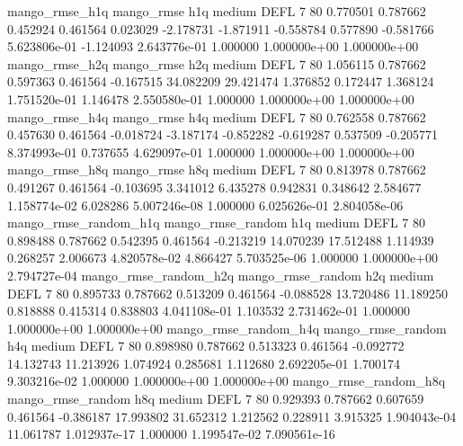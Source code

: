       mango_rmse_h1q        mango_rmse                  h1q     medium     DEFL                 7 80  0.770501       0.787662 0.452924       0.461564    0.023029     -2.178731     -1.871911    -0.558784       0.577890 -0.581766 5.623806e-01    -1.124093   2.643776e-01            1.000000    1.000000e+00        1.000000e+00
       mango_rmse_h2q        mango_rmse                  h2q     medium     DEFL                 7 80  1.056115       0.787662 0.597363       0.461564   -0.167515     34.082209     29.421474     1.376852       0.172447  1.368124 1.751520e-01     1.146478   2.550580e-01            1.000000    1.000000e+00        1.000000e+00
       mango_rmse_h4q        mango_rmse                  h4q     medium     DEFL                 7 80  0.762558       0.787662 0.457630       0.461564   -0.018724     -3.187174     -0.852282    -0.619287       0.537509 -0.205771 8.374993e-01     0.737655   4.629097e-01            1.000000    1.000000e+00        1.000000e+00
       mango_rmse_h8q        mango_rmse                  h8q     medium     DEFL                 7 80  0.813978       0.787662 0.491267       0.461564   -0.103695      3.341012      6.435278     0.942831       0.348642  2.584677 1.158774e-02     6.028286   5.007246e-08            1.000000    6.025626e-01        2.804058e-06
mango_rmse_random_h1q mango_rmse_random                  h1q     medium     DEFL                 7 80  0.898488       0.787662 0.542395       0.461564   -0.213219     14.070239     17.512488     1.114939       0.268257  2.006673 4.820578e-02     4.866427   5.703525e-06            1.000000    1.000000e+00        2.794727e-04
mango_rmse_random_h2q mango_rmse_random                  h2q     medium     DEFL                 7 80  0.895733       0.787662 0.513209       0.461564   -0.088528     13.720486     11.189250     0.818888       0.415314  0.838803 4.041108e-01     1.103532   2.731462e-01            1.000000    1.000000e+00        1.000000e+00
mango_rmse_random_h4q mango_rmse_random                  h4q     medium     DEFL                 7 80  0.898980       0.787662 0.513323       0.461564   -0.092772     14.132743     11.213926     1.074924       0.285681  1.112680 2.692205e-01     1.700174   9.303216e-02            1.000000    1.000000e+00        1.000000e+00
mango_rmse_random_h8q mango_rmse_random                  h8q     medium     DEFL                 7 80  0.929393       0.787662 0.607659       0.461564   -0.386187     17.993802     31.652312     1.212562       0.228911  3.915325 1.904043e-04    11.061787   1.012937e-17            1.000000    1.199547e-02        7.090561e-16
